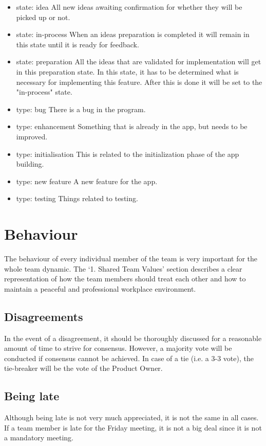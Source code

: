 \documentclass[sigconf,nonacm]{acmart}
\begin{document}
\begin{itemize}
    \item state: idea           All new ideas awaiting confirmation for whether they will be picked up or not.
    \item state: in-process     When an ideas preparation is completed it will remain in this state until it is ready for feedback.
    \item state: preparation    All the ideas that are validated for implementation will get in this preparation state. In this state, it has to be determined what is necessary for implementing this feature. After this is done it will be set to the "in-process" state.
    \item type: bug             There is a bug in the program.          
    \item type: enhancement     Something that is already in the app, but needs to be improved.
    \item type: initialisation   This is related to the initialization phase of the app building.
    \item type: new feature     A new feature for the app.
    \item type: testing         Things related to testing.
\end{itemize}


\section{Behaviour}
The behaviour of every individual member of the team is very important for the whole team dynamic. The ‘1. Shared Team Values’ section describes a clear representation of how the team members should treat each other and how to maintain a peaceful and professional workplace environment.

\subsection{Disagreements}
In the event of a disagreement, it should be thoroughly discussed for a reasonable amount of time to strive for consensus. However, a majority vote will be conducted if consensus cannot be achieved. In case of a tie (i.e. a 3-3 vote), the tie-breaker will be the vote of the Product Owner.

\subsection{Being late}
Although being late is not very much appreciated, it is not the same in all cases. If a team member is late for the Friday meeting, it is not a big deal since it is not a mandatory meeting.
\end{document}
